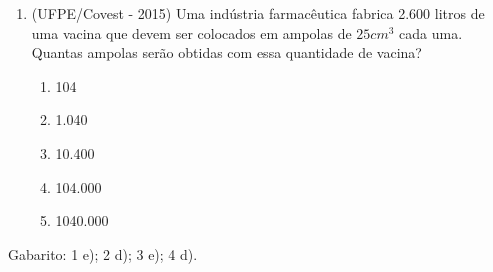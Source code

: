 \begin{enumerate}
\item (UFPE/Covest - 2015) Uma indústria farmacêutica fabrica 2.600 litros de uma vacina que devem ser colocados em ampolas de $25 cm^3$ cada uma. Quantas ampolas serão obtidas com essa quantidade de vacina?
\begin{enumerate}
\item 104
\item 1.040
\item 10.400
\item 104.000
\item 1040.000 
\end{enumerate}
\end{enumerate}
Gabarito: 1 e); 2 d); 3 e); 4 d).



